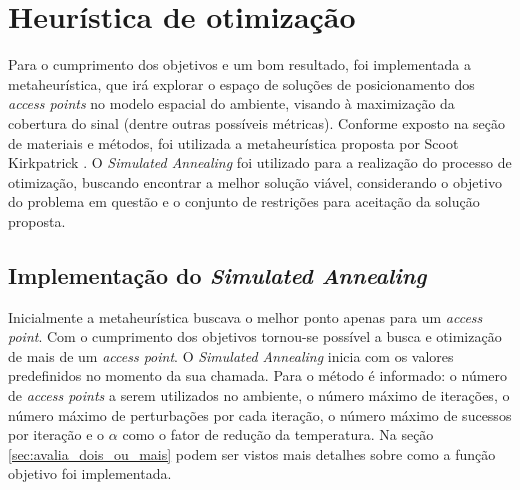 \documentclass[
	12pt,				%
	twoside,			%
	a4paper,			%
	english,			%
	french,				%
	spanish,			%
	brazil				%
	]{abntex2}
\begin{document}
\section{Heurística de
otimização}\label{heuruxedstica-de-otimizauxe7uxe3o}

Para o cumprimento dos objetivos e um bom resultado, foi implementada a
metaheurística, que irá explorar o espaço de soluções de posicionamento
dos \emph{access points} no modelo espacial do ambiente, visando à
maximização da cobertura do sinal (dentre outras possíveis métricas).
Conforme exposto na seção de materiais e métodos, foi utilizada a
metaheurística proposta por Scoot Kirkpatrick \cite{PATRICK}. O
\emph{Simulated Annealing} foi utilizado para a realização do processo
de otimização, buscando encontrar a melhor solução viável, considerando
o objetivo do problema em questão e o conjunto de restrições para
aceitação da solução proposta.

\subsection{\texorpdfstring{Implementação do \emph{Simulated
Annealing}}{Implementação do Simulated Annealing}}\label{implementauxe7uxe3o-do-simulated-annealing}

Inicialmente a metaheurística buscava o melhor ponto apenas para um
\emph{access point}. Com o cumprimento dos objetivos tornou-se possível
a busca e otimização de mais de um \emph{access point}. O
\emph{Simulated Annealing} inicia com os valores predefinidos no momento
da sua chamada. Para o método é informado: o número de \emph{access
points} a serem utilizados no ambiente, o número máximo de iterações, o
número máximo de perturbações por cada iteração, o número máximo de
sucessos por iteração e o \(\alpha\) como o fator de redução da
temperatura. Na seção \ref{sec:avalia_dois_ou_mais} podem ser vistos
mais detalhes sobre como a função objetivo foi implementada.
\end{document}
